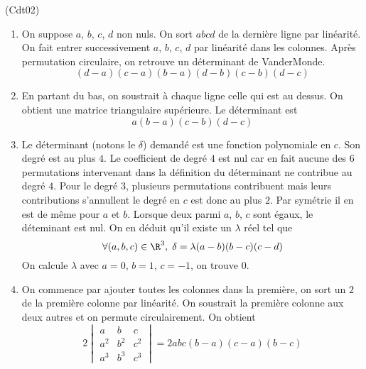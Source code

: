 \begin{tiny}(Cdt02)\end{tiny}\begin{enumerate}
 \item On suppose $a$, $b$, $c$, $d$ non nuls. On sort $abcd$ de la dernière ligne par linéarité. On fait entrer successivement $a$, $b$, $c$, $d$ par linéarité dans les colonnes. Après permutation circulaire, on retrouve un déterminant de VanderMonde.
\begin{displaymath}
 (d-a)(c-a)(b-a)(d-b)(c-b)(d-c)
\end{displaymath}

 \item En partant du bas, on soustrait à chaque ligne celle qui est au dessus. On obtient une matrice triangulaire supérieure. Le déterminant est
 \begin{displaymath}
   a(b-a)(c-b)(d-c)
 \end{displaymath}

 \item Le déterminant (notons le $\delta$) demandé est une fonction polynomiale en $c$. Son degré est au plus $4$. Le coefficient de degré $4$ est nul car en fait aucune des $6$ permutations intervenant dans la définition du déterminant ne contribue au degré $4$. Pour le degré $3$, plusieurs permutations contribuent mais leurs contributions s'annullent le degré en $c$ est donc au plus $2$. Par symétrie il en est de même pour $a$ et $b$. Lorsque deux parmi $a$, $b$, $c$ sont égaux, le déteminant est nul. On en déduit qu'il existe un $\lambda$ réel tel que 
\begin{displaymath}
\forall (a,b,c) \in \R^3, \; \delta = \lambda(a-b)(b-c)(c-d)
\end{displaymath}
 On calcule $\lambda$ avec $a=0$, $b=1$, $c=-1$, on trouve $0$.
 
 \item On commence par ajouter toutes les colonnes dans la première, on sort un $2$ de la première colonne par linéarité. On soustrait la première colonne aux deux autres et on permute circulairement. On obtient
\begin{displaymath}
 2
\begin{vmatrix}
 a & b & c \\ a^2 & b^2 & c^2 \\ a^3 & b^3 & c^3
\end{vmatrix}
=2abc(b-a)(c-a)(b-c)
\end{displaymath}

\end{enumerate}

